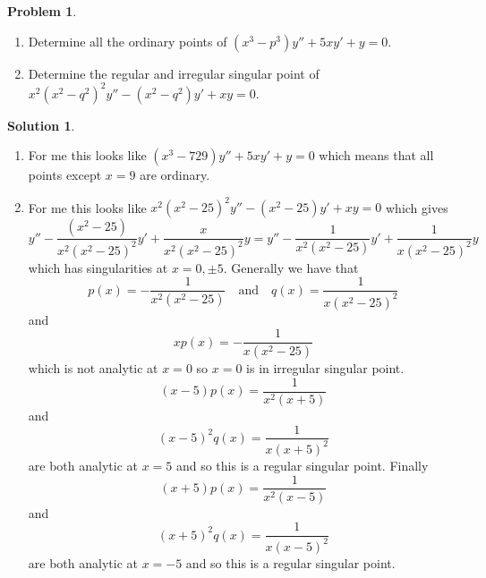 \documentclass[10pt]{article}
\theoremstyle{definition}
\newtheorem{problem}{Problem}
\newtheorem{soln}{Solution}
\begin{document}
\begin{problem}~
\begin{enumerate}[label=(\alph*)]
  \item Determine all the ordinary points of $(x^3 -p^3)y'' + 5xy' + y = 0$.
  \item Determine the regular and irregular singular point of $x^2(x^2 - q^2)^2y'' - (x^2 - q^2)y' + xy = 0$.
\end{enumerate}
\end{problem}
\begin{soln}~
  \begin{enumerate}[label=(\alph*)]
    \item For me this looks like $(x^3 -729)y'' + 5xy' + y = 0$ which means that all points except $x=9$ are ordinary.
    \item For me this looks like $x^2(x^2 - 25)^2y'' - (x^2 - 25)y' + xy =0$
          which gives
          $$y'' - \frac{(x^2 - 25)}{x^2(x^2 - 25)^2}y' + \frac{x}{x^2(x^2 - 25)^2}y =
            y'' - \frac{1}{x^2(x^2 - 25)}y' + \frac{1}{x(x^2 - 25)^2}y
          $$
          which has singularities at $x=0,\pm 5$. Generally we have that
          $$p(x)=- \frac{1}{x^2(x^2 - 25)}\quad\text{and}\quad q(x)=\frac{1}{x(x^2 - 25)^2}$$
          and $$xp(x)=- \frac{1}{x(x^2 - 25)}$$
          which is not analytic at $x=0$ so $x=0$ is in irregular singular point.
          $$(x-5)p(x)= \frac{1}{x^2(x+5)}$$
          and
          $$(x-5)^2q(x)= \frac{1}{x(x+5)^2}$$
          are both analytic at $x=5$ and so this is a regular singular point. Finally
          $$(x+5)p(x)= \frac{1}{x^2(x-5)}$$
          and
          $$(x+5)^2q(x)= \frac{1}{x(x-5)^2}$$
          are both analytic at $x=-5$ and so this is a regular singular point.
  \end{enumerate}
\end{soln}
\end{document}
